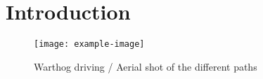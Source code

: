 \section{Introduction}
\label{sec:intro}

\lightlipsum[1]

\begin{figure} [h]
	\centering
	\texttt{[image: example-image]}
	\caption{Warthog driving / Aerial shot of the different paths}
	\label{fig:front_fig}
\end{figure}

\lightlipsum[1]
\lightlipsum[1]
\lightlipsum[1]